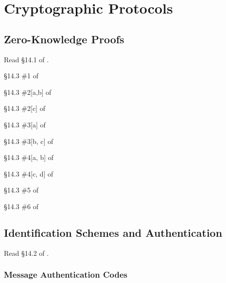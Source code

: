 \chapter{Cryptographic Protocols}
\label{ch:protocols}
	\section{Zero-Knowledge Proofs}

Read \S 14.1 of \cite{tw}.

\begin{problem}[10 points]
	\S 14.3 \#1 of \cite {tw}
\end{problem}

\begin{problem}[15 points]
	\S 14.3 \#2[a,b] of \cite {tw}
\end{problem}

\begin{problem}[10 points]
	\S 14.3 \#2[c] of \cite {tw}
\end{problem}

\begin{problem}[10 points]
	\S 14.3 \#3[a] of \cite {tw}
\end{problem}

\begin{problem}[15 points]
	\S 14.3 \#3[b, c] of \cite {tw}
\end{problem}

\begin{problem}[15 points]
	\S 14.3 \#4[a, b] of \cite {tw}
\end{problem}

\begin{problem}[15 points]
	\S 14.3 \#4[c, d] of \cite {tw}
\end{problem}

\begin{problem}[15 points]
	\S 14.3 \#5 of \cite {tw}
\end{problem}

\begin{problem}[15 points]
	\S 14.3 \#6 of \cite {tw}
\end{problem}

	\section{Identification Schemes and Authentication}
Read \S 14.2 of \cite{tw}.

	\subsection{Message Authentication Codes}
	\label{sssec:mac}

